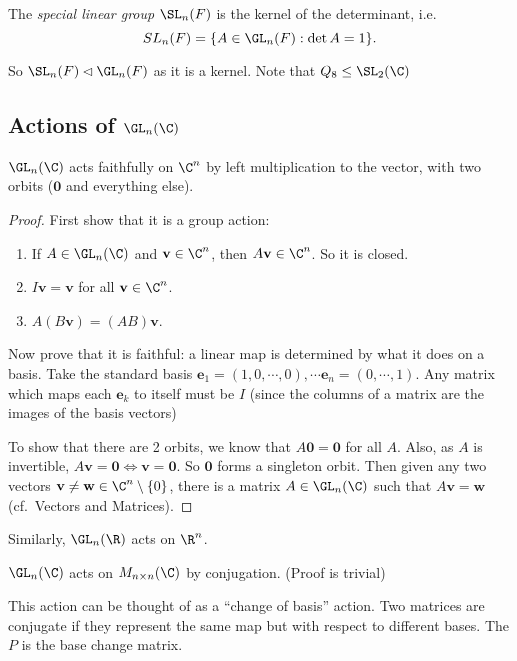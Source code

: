 \documentclass[a4paper]{article}
\begin{document}
\begin{defi}
  The \emph{special linear group} $\SL_n(F)$ is the kernel of the determinant, i.e.
  \[
    SL_n(F) = \{A\in \GL_n(F): \det A = 1\}.
  \]
\end{defi}

So $\SL_n(F)\lhd \GL_n(F)$ as it is a kernel. Note that $Q_8\leq \SL_2(\C)$
\subsection{Actions of \texorpdfstring{$\GL_n(\C)$}{GLn(C)}}
\begin{prop}
  $\GL_n(\C)$ acts faithfully on $\C^n$ by left multiplication to the vector, with two orbits ($\mathbf{0}$ and everything else).
\end{prop}

\begin{proof}
  First show that it is a group action:
  \begin{enumerate}[label=\arabic{*}.]
      \setcounter{enumi}{0}
    \item If $A\in \GL_n(\C)$ and $\mathbf{v}\in \C^n$, then $A\mathbf{v}\in \C^n$. So it is closed.
    \item $I\mathbf{v} = \mathbf{v}$ for all $\mathbf{v}\in \C^n$.
    \item $A(B\mathbf{v}) = (AB)\mathbf{v}$.
  \end{enumerate}

  Now prove that it is faithful: a linear map is determined by what it does on a basis. Take the standard basis $\mathbf{e}_1 = (1, 0, \cdots, 0), \cdots \mathbf{e}_n = (0, \cdots, 1)$. Any matrix which maps each $\mathbf{e}_k$ to itself must be $I$ (since the columns of a matrix are the images of the basis vectors)

  To show that there are 2 orbits, we know that $A\mathbf{0} = \mathbf{0}$ for all $A$. Also, as $A$ is invertible, $A\mathbf{v} = \mathbf{0}\Leftrightarrow \mathbf{v} = \mathbf{0}$. So $\mathbf{0}$ forms a singleton orbit. Then given any two vectors $\mathbf{v}\not= \mathbf{w}\in \C^n\setminus\{0\}$, there is a matrix $A\in \GL_n(\C)$ such that $A\mathbf{v} = \mathbf{w}$ (cf.\ Vectors and Matrices).
\end{proof}

Similarly, $\GL_n(\R)$ acts on $\R^n$.

\begin{prop}
  $\GL_n(\C)$ acts on $M_{n\times n}(\C)$ by conjugation. (Proof is trivial)
\end{prop}
This action can be thought of as a ``change of basis'' action. Two matrices are conjugate if they represent the same map but with respect to different bases. The $P$ is the base change matrix.
\end{document}
